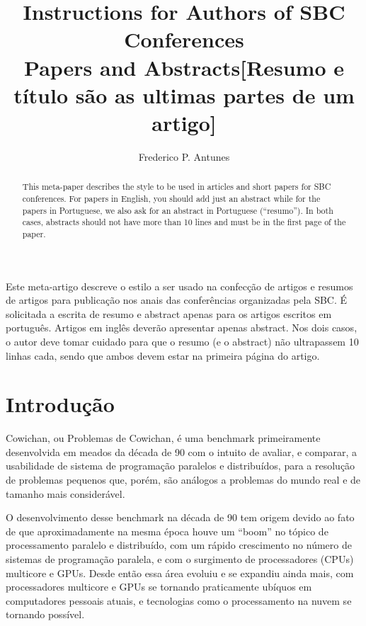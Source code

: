 \documentclass[12pt]{article}
\title{Instructions for Authors of SBC Conferences\\ Papers and Abstracts[Resumo e título são as ultimas partes de um artigo]}
\author{Frederico P. Antunes\inst{1}}
\begin{document}
 

\maketitle

\begin{abstract}
  This meta-paper describes the style to be used in articles and short papers
  for SBC conferences. For papers in English, you should add just an abstract
  while for the papers in Portuguese, we also ask for an abstract in
  Portuguese (``resumo''). In both cases, abstracts should not have more than
  10 lines and must be in the first page of the paper.
\end{abstract}
     
\begin{resumo} 
   Este meta-artigo descreve o estilo a ser usado na confecção de artigos e
  resumos de artigos para publicação nos anais das conferências organizadas
  pela SBC. É solicitada a escrita de resumo e abstract apenas para os artigos
  escritos em português. Artigos em inglês deverão apresentar apenas abstract.
  Nos dois casos, o autor deve tomar cuidado para que o resumo (e o abstract)
  não ultrapassem 10 linhas cada, sendo que ambos devem estar na primeira
  página do artigo.
\end{resumo}


\section{Introdução}

Cowichan, ou Problemas de Cowichan, é uma benchmark primeiramente desenvolvida em meados da década de 90 com o intuito de avaliar, e comparar, a usabilidade de sistema de programação paralelos e distribuídos, para a resolução de problemas pequenos que, porém, são análogos a problemas do mundo real e de tamanho mais considerável.

O desenvolvimento desse benchmark na década de 90 tem origem devido ao fato de que aproximadamente na mesma época houve um “boom” no tópico de processamento paralelo e distribuído, com um rápido crescimento no número de sistemas de programação paralela, e com o surgimento de processadores (CPUs) multicore e GPUs. Desde então essa área evoluiu e se expandiu ainda mais, com processadores multicore e GPUs se tornando praticamente ubíquos em computadores pessoais atuais, e tecnologias como o processamento na nuvem se tornando possível.
\end{document}
